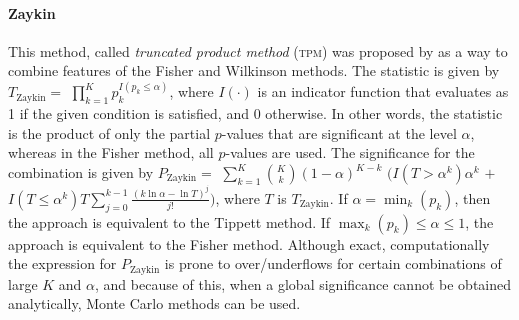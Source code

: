 \paragraph{Zaykin} This method, called \emph{truncated product method} (\textsc{tpm}) was proposed by \citet{Zaykin2002} as a way to combine features of the Fisher and Wilkinson methods. The statistic is given by $T_{\text{Zaykin}}=$ $\prod_{k=1}^{K} p_{k}^{I\left(p_{k} \leqslant \alpha\right)}$, where $I\left(\cdot\right)$ is an indicator function that evaluates as 1 if the given condition is satisfied, and 0 otherwise. In other words, the statistic is the product of only the partial $p$-values that are significant at the level $\alpha$, whereas in the Fisher method, all $p$-values are used. The significance for the combination is given by $P_{\text{Zaykin}} =$ $\sum_{k=1}^{K}\binom{K}{k}\left(1-\alpha\right)^{K-k}$ $\Big(I\left(T > \alpha^{k}\right) \alpha^{k}$ $+$ $I\left(T \leqslant \alpha^{k}\right)T\sum_{j=0}^{k-1}\frac{\left(k\ln \alpha - \ln T\right)^{j}}{j!}\Big)$, where $T$ is $T_{\text{Zaykin}}$.  If $\alpha = \min_{k}\left(p_{k}\right)$, then the approach is equivalent to the Tippett method. If $\max_{k}\left(p_{k}\right) \leqslant \alpha \leqslant 1$, the approach is equivalent to the Fisher method. Although exact, computationally the expression for $P_{\text{Zaykin}}$ is prone to over/underflows for certain combinations of large $K$ and $\alpha$, and because of this, when a global significance cannot be obtained analytically, Monte Carlo methods can be used.

